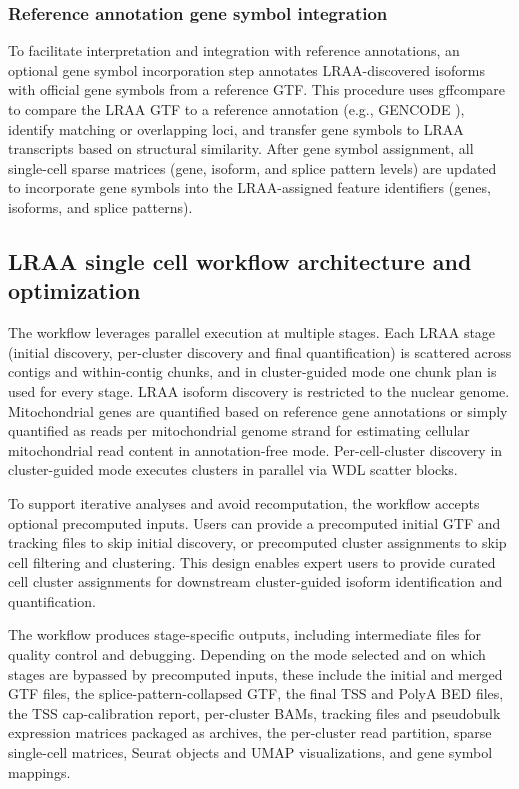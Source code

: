 \subsubsection{Reference annotation gene symbol integration}\label{reference-annotation-gene-symbol-integration}

To facilitate interpretation and integration with reference annotations, an optional gene symbol incorporation step annotates LRAA-discovered isoforms with official gene symbols from a reference GTF. This procedure uses gffcompare \citep{pertea2020} to compare the LRAA GTF to a reference annotation (e.g., GENCODE \citealp{mudge2025}), identify matching or overlapping loci, and transfer gene symbols to LRAA transcripts based on structural similarity. After gene symbol assignment, all single-cell sparse matrices (gene, isoform, and splice pattern levels) are updated to incorporate gene symbols into the LRAA-assigned feature identifiers (genes, isoforms, and splice patterns).

\subsection{LRAA single cell workflow architecture and optimization}\label{lraa-single-cell-workflow-architecture-and-optimization}

The workflow leverages parallel execution at multiple stages. Each LRAA stage (initial discovery, per-cluster discovery and final quantification) is scattered across contigs and within-contig chunks, and in cluster-guided mode one chunk plan is used for every stage. LRAA isoform discovery is restricted to the nuclear genome. Mitochondrial genes are quantified based on reference gene annotations or simply quantified as reads per mitochondrial genome strand for estimating cellular mitochondrial read content in annotation-free mode. Per-cell-cluster discovery in cluster-guided mode executes clusters in parallel via WDL scatter blocks.

To support iterative analyses and avoid recomputation, the workflow accepts optional precomputed inputs. Users can provide a precomputed initial GTF and tracking files to skip initial discovery, or precomputed cluster assignments to skip cell filtering and clustering. This design enables expert users to provide curated cell cluster assignments for downstream cluster-guided isoform identification and quantification.

The workflow produces stage-specific outputs, including intermediate files for quality control and debugging. Depending on the mode selected and on which stages are bypassed by precomputed inputs, these include the initial and merged GTF files, the splice-pattern-collapsed GTF, the final TSS and PolyA BED files, the TSS cap-calibration report, per-cluster BAMs, tracking files and pseudobulk expression matrices packaged as archives, the per-cluster read partition, sparse single-cell matrices, Seurat objects and UMAP visualizations, and gene symbol mappings.

